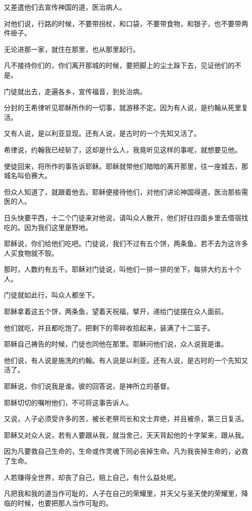 \documentclass[12pt,oneside]{book}
\begin{document}
又差遣他们去宣传神国的道，医治病人。

对他们说，行路的时候，不要带拐杖，和口袋，不要带食物，和银子，也不要带两件褂子。

无论进那一家，就住在那里，也从那里起行。

凡不接待你们的，你们离开那城的时候，要把脚上的尘土跺下去，见证他们的不是。

门徒就出去，走遍各乡，宣传福音，到处治病。

分封的王希律听见耶稣所作的一切事，就游移不定。因为有人说，是约翰从死里复活。

又有人说，是以利亚显现。还有人说，是古时的一个先知又活了。

希律说，约翰我已经斩了，这却是什么人，我竟听见这样的事呢，就想要见他。

使徒回来，将所作的事告诉耶稣。耶稣就带他们暗暗的离开那里，往一座城去，那城名叫伯赛大。

但众人知道了，就跟着他去。耶稣便接待他们，对他们讲论神国得道，医治那些需医的人。

日头快要平西，十二个门徒来对他说，请叫众人散开，他们好往四面乡里去借宿找吃的。因为我们这里是野地。

耶稣说，你们给他们吃吧。门徒说，我们不过有五个饼，两条鱼。若不去为这许多人买食物就不彀。

那时，人数约有五千。耶稣对门徒说，叫他们一排一排的坐下，每排大约五十个人。

门徒就如此行，叫众人都坐下。

耶稣拿着这五个饼，两条鱼，望着天祝福，擘开，递给门徒摆在众人面前。

他们就吃，并且都吃饱了。把剩下的零碎收拾起来，装满了十二篮子。

耶稣自己祷告的时候，门徒也同他在那里。耶稣问他们说，众人说我是谁。

他们说，有人说是施洗的约翰。有人说是以利亚。还有人说，是古时的一个先知又活了。

耶稣说，你们说我是谁。彼的回答说，是神所立的基督。

耶稣切切的嘱咐他们，不可将这事告诉人。

又说，人子必须受许多的苦，被长老祭司长和文士弃绝，并且被杀，第三日复活。

耶稣又对众人说，若有人要跟从我，就当舍己，天天背起他的十字架来，跟从我。

因为凡要救自己生命的，生命或作灵魂下同必丧掉生命。凡为我丧掉生命的，必救了生命。

人若赚得全世界，却丧了自己，赔上自己，有什么益处呢。

凡把我和我的道当作可耻的，人子在自己的荣耀里，并天父与圣天使的荣耀里，降临的时候，也要把那人当作可耻的。
\end{document}
